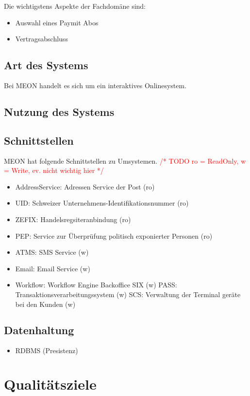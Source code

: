 Die wichtigstens Aspekte der Fachdomäne sind: 
\begin{itemize}
	\item Auswahl eines Paymit Abos
	\item Vertragsabschluss
\end{itemize}

\subsection{Art des Systems}

Bei MEON handelt es sich um ein interaktives Onlinesystem.

\subsection{Nutzung des Systems}

\subsection{Schnittstellen}

MEON hat folgende Schnittstellen zu Umsystemen. \textcolor{red}{/* TODO ro = ReadOnly, w = Write, ev. nicht wichtig hier */}
\begin{itemize}
	\item AddressService: Adressen Service der Post (ro)
	\item UID: Schweizer Unternehmens-Identifikationsnummer (ro) 
	\item ZEFIX: Handelsregsiteranbindung (ro)
	\item PEP: Service zur Überprüfung politisch exponierter Personen (ro)
	\item ATMS: SMS Service (w)
	\item Email: Email Service (w)
	\item Workflow: Workflow Engine Backoffice SIX (w)
	\subitem PASS: Transaktionsverarbeitungssystem (w)
	\subitem SCS:  Verwaltung der Terminal geräte bei den Kunden (w)
\end{itemize}

\subsection{Datenhaltung}

\begin{itemize}
	\item RDBMS (Presistenz)
\end{itemize}

\section{Qualitätsziele}

